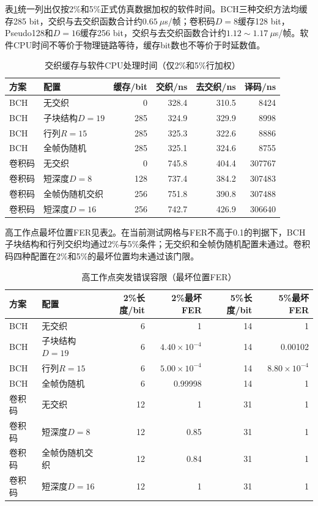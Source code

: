 表\ref{tab:s7-buffer-time}统一列出仅按2\%和5\%正式仿真数据加权的软件时间。BCH三种交织方法均缓存285 bit，交织与去交织函数合计约$0.65~\mu$s/帧；卷积码$D=8$缓存128 bit，Pseudo128和$D=16$缓存256 bit，交织与去交织函数合计约$1.12\sim1.17~\mu$s/帧。软件CPU时间不等价于物理链路等待，缓存bit数也不等价于时延数值。

\begin{table}[htbp]
  \centering
  \caption{交织缓存与软件CPU处理时间（仅2\%和5\%行加权）}
  \label{tab:s7-buffer-time}
  \footnotesize
  \begin{tabular}{llrrrr}
    \toprule
    方案 & 配置 & 缓存/bit & 交织/ns & 去交织/ns & 译码/ns \\
    \midrule
    BCH & 无交织 & 0 & 328.4 & 310.5 & 8424 \\
    BCH & 子块结构$D=19$ & 285 & 324.9 & 329.9 & 8998 \\
    BCH & 行列$R=15$ & 285 & 325.3 & 322.6 & 8886 \\
    BCH & 全帧伪随机 & 285 & 325.1 & 324.6 & 8755 \\
    卷积码 & 无交织 & 0 & 745.8 & 404.4 & 307767 \\
    卷积码 & 短深度$D=8$ & 128 & 737.4 & 384.2 & 307483 \\
    卷积码 & 全帧伪随机交织 & 256 & 751.8 & 390.8 & 307488 \\
    卷积码 & 短深度$D=16$ & 256 & 742.7 & 426.9 & 306640 \\
    \bottomrule
  \end{tabular}
\end{table}

高工作点最坏位置FER见表\ref{tab:s7-burst-tolerance}。在当前测试网格与FER不高于0.1的判据下，BCH子块结构和行列交织均通过2\%与5\%条件；无交织和全帧伪随机配置未通过。卷积码四种配置在2\%和5\%的最坏位置均未通过该门限。

\begin{table}[htbp]
  \centering
  \caption{高工作点突发错误容限（最坏位置FER）}
  \label{tab:s7-burst-tolerance}
  \footnotesize
  \begin{tabular}{llrrrr}
    \toprule
    方案 & 配置 & 2\%长度/bit & 2\%最坏FER & 5\%长度/bit & 5\%最坏FER \\
    \midrule
    BCH & 无交织 & 6 & 1 & 14 & 1 \\
    BCH & 子块结构$D=19$ & 6 & $4.40\times10^{-4}$ & 14 & 0.00102 \\
    BCH & 行列$R=15$ & 6 & $5.00\times10^{-4}$ & 14 & $8.80\times10^{-4}$ \\
    BCH & 全帧伪随机 & 6 & 0.99998 & 14 & 1 \\
    卷积码 & 无交织 & 12 & 1 & 31 & 1 \\
    卷积码 & 短深度$D=8$ & 12 & 0.85 & 31 & 1 \\
    卷积码 & 全帧伪随机交织 & 12 & 0.84 & 31 & 1 \\
    卷积码 & 短深度$D=16$ & 12 & 1 & 31 & 1 \\
    \bottomrule
  \end{tabular}
\end{table}

